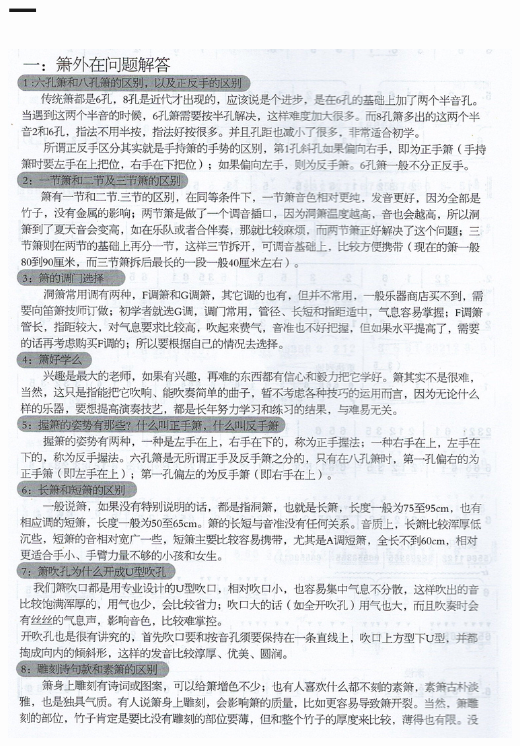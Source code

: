 \documentclass[cn,pad,chinese,chinesefont=nofont]{elegantbook}
\begin{document}
\section{一}
\includegraphics[height=0.8\textheight]{dongxiao/Scan 20.jpeg}
\end{document}

